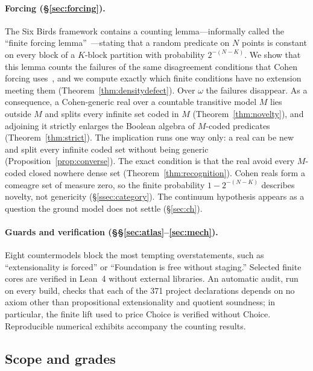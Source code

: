 \paragraph{Forcing (\S\ref{sec:forcing}).} The Six Birds framework contains a counting
lemma---informally called the ``finite forcing lemma''~\citep{SBTFoundationsI}---stating that a
random predicate on $N$ points is constant on every block of a $K$-block partition with
probability $2^{-(N-K)}$. We show that this lemma counts the failures of the same disagreement
conditions that Cohen forcing uses~\citep{Cohen1963, Cohen1966}, and we compute exactly which
finite conditions have no extension meeting them (Theorem~\ref{thm:densitydefect}). Over
$\omega$ the failures disappear. As a consequence, a Cohen-generic real over a countable
transitive model $M$ lies outside $M$ and splits every infinite set coded in $M$
(Theorem~\ref{thm:novelty}), and adjoining it strictly enlarges the Boolean algebra of
$M$-coded predicates (Theorem~\ref{thm:strict}). The implication runs one way only: a real can
be new and split every infinite coded set without being generic
(Proposition~\ref{prop:converse}). The exact condition is that the real avoid every $M$-coded
closed nowhere dense set (Theorem~\ref{thm:recognition}). Cohen reals form a comeagre set of
measure zero, so the finite probability $1-2^{-(N-K)}$ describes novelty, not genericity
(\S\ref{ssec:category}). The continuum hypothesis appears as a question the ground model does
not settle (\S\ref{sec:ch}).

\paragraph{Guards and verification (\S\S\ref{sec:atlas}--\ref{sec:mech}).} Eight countermodels
block the most tempting overstatements, such as ``extensionality is forced'' or ``Foundation is
free without staging.'' Selected finite cores are verified in Lean~4 without external libraries.
An automatic audit, run on every build, checks that each of the 371 project declarations depends
on no axiom other than propositional extensionality and quotient soundness; in particular, the
finite lift used to price Choice is verified without Choice. Reproducible numerical exhibits
accompany the counting results.

\subsection{Scope and grades}

